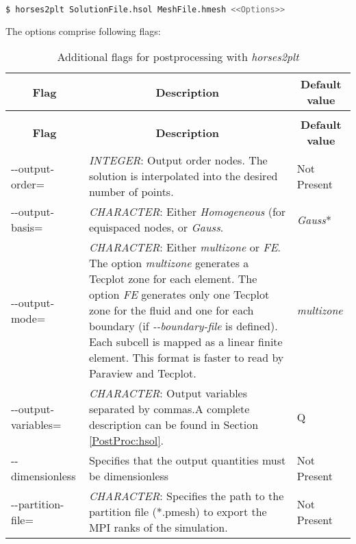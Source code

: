 \documentclass[a4paper,10pt]{report}
\begin{document}
\begin{lstlisting}[language=bash]
	$ horses2plt SolutionFile.hsol MeshFile.hmesh <<Options>>
\end{lstlisting}

The options comprise following flags:

\begin{longtable}{|p{4cm}|p{10cm}|p{2.2cm}|}
\caption{Flags for \textit{horses2plt}.} \label{tab:Postprocessing} \\
\hline
\multicolumn{1}{|c|}{\textbf{Flag}} & \multicolumn{1}{c|}{\textbf{Description}} & \multicolumn{1}{c|}{\textbf{Default value}} \\ \hline
\endfirsthead

\caption{Additional flags for postprocessing with \textit{horses2plt}} \\
\hline
\multicolumn{1}{|c|}{\textbf{Flag}} & \multicolumn{1}{c|}{\textbf{Description}} & \multicolumn{1}{c|}{\textbf{Default value}} \\ \hline
\endhead

-{}-output-order= 	&
			\textit{INTEGER}: Output order nodes. The solution is interpolated into the desired number of points. &
							Not Present \\ \hline

-{}-output-basis= 	&
			\textit{CHARACTER}: Either \textit{Homogeneous} (for equispaced nodes, or \textit{Gauss}.  &
							\textit{Gauss}* \\ \hline

-{}-output-mode= 	&
			\textit{CHARACTER}: Either \textit{multizone} or \textit{FE}. The option \textit{multizone} generates a Tecplot zone for each element. The option \textit{FE} generates only one Tecplot zone for the fluid and one for each boundary (if \textit{-{}-boundary-file} is defined).
			Each subcell is mapped as a linear finite element. This format is faster to read by Paraview and Tecplot.  &
							\textit{multizone} \\ \hline

-{}-output-variables= 	&
			\textit{CHARACTER}: Output variables separated by commas.A complete description can be found in Section \ref{PostProc:hsol}. &
							Q \\ \hline

-{}-dimensionless 	&
			Specifies that the output quantities must be dimensionless &
							Not Present  \\ \hline

-{}-partition-file= 	&
			\textit{CHARACTER}: Specifies the path to the partition file (*.pmesh) to export the MPI ranks of the simulation. &
							Not Present  \\ \hline


\end{longtable}
\end{document}
